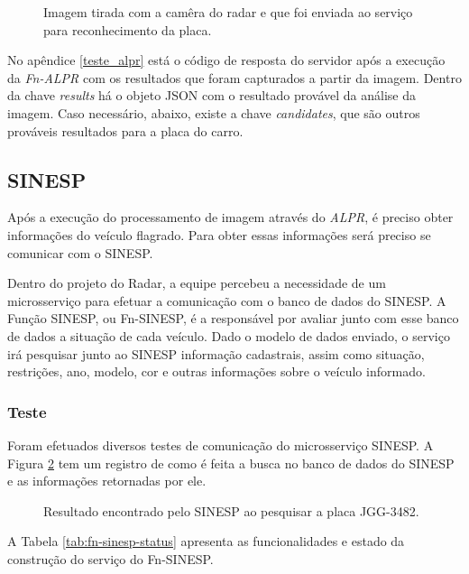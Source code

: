 \begin{figure}[H]
	\caption{\label{fig:teste-alpr-foto-carro} Imagem tirada com a camêra do radar e que foi enviada ao serviço para reconhecimento da placa.}
\end{figure}

No apêndice \ref{teste_alpr} está o código de resposta do servidor após a execução da \textit{Fn-ALPR} com os resultados que foram capturados a partir da imagem. Dentro da chave \textit{results} há o objeto JSON com o resultado provável da análise da imagem. Caso necessário, abaixo, existe a chave \textit{candidates}, que são outros prováveis resultados para a placa do carro.

\subsection{SINESP}

Após a execução do processamento de imagem através do \textit{ALPR}, é preciso obter informações do veículo flagrado. Para obter essas informações será preciso se comunicar com o SINESP.

Dentro do projeto do Radar, a equipe percebeu a necessidade de um microsserviço para efetuar a comunicação com o banco de dados do SINESP. A Função SINESP, ou Fn-SINESP, é a responsável por avaliar junto com esse banco de dados a situação de cada veículo. Dado o modelo de dados enviado, o serviço irá pesquisar junto ao SINESP informação cadastrais, assim como situação, restrições, ano, modelo, cor e outras informações sobre o veículo informado.

\subsubsection{Teste}

Foram efetuados diversos testes de comunicação do microsserviço SINESP. A Figura \ref{fig:sinesp} tem um registro de como é feita a busca no banco de dados do SINESP e as informações retornadas por ele.

\begin{figure}[H]
	\caption{\label{fig:sinesp} Resultado encontrado pelo SINESP ao pesquisar a placa JGG-3482.}
\end{figure}

A Tabela \ref{tab:fn-sinesp-status} apresenta as funcionalidades e estado da construção do serviço do Fn-SINESP.

